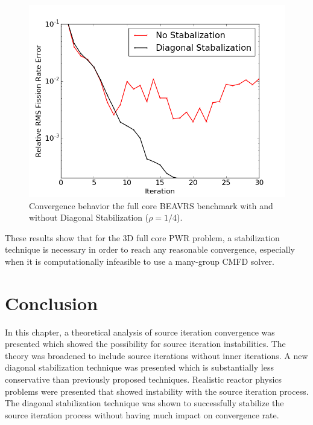 \begin{figure}[ht!]
	\centering
	\includegraphics[width=0.65\linewidth]{figures/convergence/full-core-3D.png}
	\caption{Convergence behavior the full core \ac{BEAVRS} benchmark with and without Diagonal Stabilization ($\rho = 1/4$).}
	\label{fig:fc-3D}
\end{figure}

These results show that for the 3D full core \ac{PWR} problem, a stabilization technique is necessary in order to reach any reasonable convergence, especially when it is computationally infeasible to use a many-group \ac{CMFD} solver.





\section{Conclusion}
\label{sec:convergence-conclusion}

In this chapter, a theoretical analysis of source iteration convergence was presented which showed the possibility for source iteration instabilities. The theory was broadened to include source iterations without inner iterations. A new diagonal stabilization technique was presented which is substantially less conservative than previously proposed techniques. Realistic reactor physics problems were presented that showed instability with the source iteration process. The diagonal stabilization technique was shown to successfully stabilize the source iteration process without having much impact on convergence rate.

